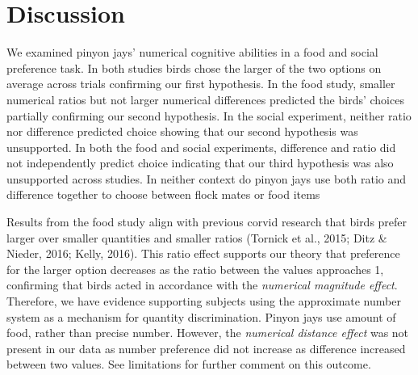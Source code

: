 \documentclass[
  ,doc,floatsintext]{apa6}
\begin{document}
\hypertarget{discussion}{%
\section{Discussion}\label{discussion}}

We examined pinyon jays' numerical cognitive abilities in a food and social preference task. In both studies birds chose the larger of the two options on average across trials confirming our first hypothesis. In the food study, smaller numerical ratios but not larger numerical differences predicted the birds' choices partially confirming our second hypothesis. In the social experiment, neither ratio nor difference predicted choice showing that our second hypothesis was unsupported. In both the food and social experiments, difference and ratio did not independently predict choice indicating that our third hypothesis was also unsupported across studies. In neither context do pinyon jays use both ratio and difference together to choose between flock mates or food items

Results from the food study align with previous corvid research that birds prefer larger over smaller quantities and smaller ratios (Tornick et al., 2015; Ditz \& Nieder, 2016; Kelly, 2016). This ratio effect supports our theory that preference for the larger option decreases as the ratio between the values approaches 1, confirming that birds acted in accordance with the \emph{numerical magnitude effect}. Therefore, we have evidence supporting subjects using the approximate number system as a mechanism for quantity discrimination. Pinyon jays use amount of food, rather than precise number. However, the \emph{numerical distance effect} was not present in our data as number preference did not increase as difference increased between two values. See limitations for further comment on this outcome.
\end{document}
